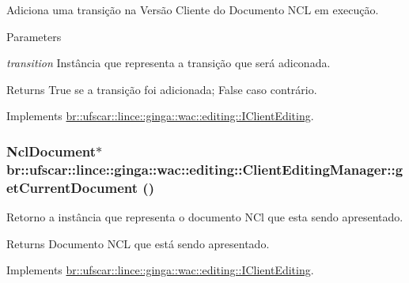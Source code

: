 Adiciona uma transição na Versão Cliente do Documento NCL em execução. 


\begin{DoxyParams}{Parameters}
\item[{\em transition}]Instância que representa a transição que será adiconada. \end{DoxyParams}
\begin{DoxyReturn}{Returns}
True se a transição foi adicionada; False caso contrário. 
\end{DoxyReturn}


Implements \hyperlink{classbr_1_1ufscar_1_1lince_1_1ginga_1_1wac_1_1editing_1_1IClientEditing_a8de701b01f8095605897a83002ea9fb0}{br::ufscar::lince::ginga::wac::editing::IClientEditing}.

\hypertarget{classbr_1_1ufscar_1_1lince_1_1ginga_1_1wac_1_1editing_1_1ClientEditingManager_a49b1b969381d54583a4c0ae61756ba7b}{
\subsubsection[{getCurrentDocument}]{\setlength{\rightskip}{0pt plus 5cm}NclDocument$\ast$ br::ufscar::lince::ginga::wac::editing::ClientEditingManager::getCurrentDocument ()}}
\label{classbr_1_1ufscar_1_1lince_1_1ginga_1_1wac_1_1editing_1_1ClientEditingManager_a49b1b969381d54583a4c0ae61756ba7b}


Retorno a instância que representa o documento NCl que esta sendo apresentado. 

\begin{DoxyReturn}{Returns}
Documento NCL que está sendo apresentado. 
\end{DoxyReturn}


Implements \hyperlink{classbr_1_1ufscar_1_1lince_1_1ginga_1_1wac_1_1editing_1_1IClientEditing_a72ba6d8611de7d1b8569a5b5d68e4fb9}{br::ufscar::lince::ginga::wac::editing::IClientEditing}.

